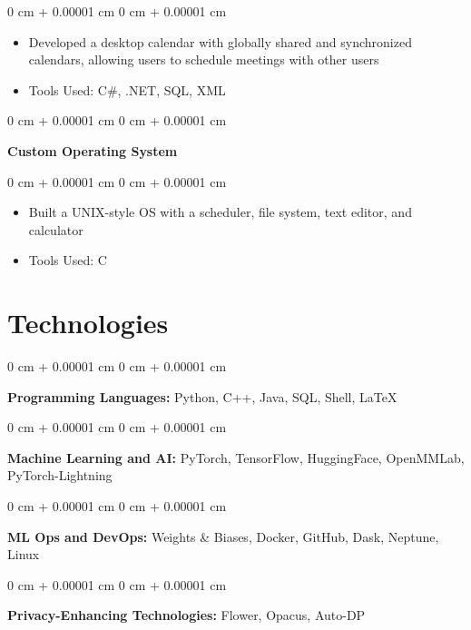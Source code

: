 \documentclass[10pt, a4paper]{article}
\newenvironment{highlights}{
    \begin{itemize}[
        topsep=0.10 cm,
        parsep=0.10 cm,
        partopsep=0pt,
        itemsep=0pt,
        leftmargin=0 cm + 10pt
    ]
}{
    \end{itemize}
} %
\newenvironment{onecolentry}{
    \begin{adjustwidth}{
        0 cm + 0.00001 cm
    }{
        0 cm + 0.00001 cm
    }
}{
    \end{adjustwidth}
} %
\newenvironment{twocolentry}[2][]{
    \onecolentry
    \def\secondColumn{#2}
    \setcolumnwidth{\fill, 4.5 cm}
    \begin{paracol}{2}
}{
    \switchcolumn \raggedleft \secondColumn
    \end{paracol}
    \endonecolentry
} %
\begin{document}
        \vspace{0.10 cm}
        \begin{onecolentry}
            \begin{highlights}
                \item Developed a desktop calendar with globally shared and synchronized calendars, allowing users to schedule meetings with other users
                \item Tools Used: C\#, .NET, SQL, XML
            \end{highlights}
        \end{onecolentry}


        \vspace{0.2 cm}

        \begin{twocolentry}{
            2002
        }
            \textbf{Custom Operating System}\end{twocolentry}

        \vspace{0.10 cm}
        \begin{onecolentry}
            \begin{highlights}
                \item Built a UNIX-style OS with a scheduler, file system, text editor, and calculator
                \item Tools Used: C
            \end{highlights}
        \end{onecolentry}



    
    \section{Technologies}



        
        \begin{onecolentry}
            \textbf{Programming Languages:} Python, C++, Java, SQL, Shell, \LaTeX
        \end{onecolentry}

        \vspace{0.2 cm}

        \begin{onecolentry}
            \textbf{Machine Learning and AI:} PyTorch, TensorFlow, HuggingFace, OpenMMLab, PyTorch-Lightning
        \end{onecolentry}

        \vspace{0.2 cm}

        \begin{onecolentry}
            \textbf{ML Ops and DevOps:} Weights \& Biases, Docker, GitHub, Dask, Neptune, Linux
        \end{onecolentry}

        \vspace{0.2 cm}

        \begin{onecolentry}
            \textbf{Privacy-Enhancing Technologies:} Flower, Opacus, Auto-DP
        \end{onecolentry}


    
\end{document}
